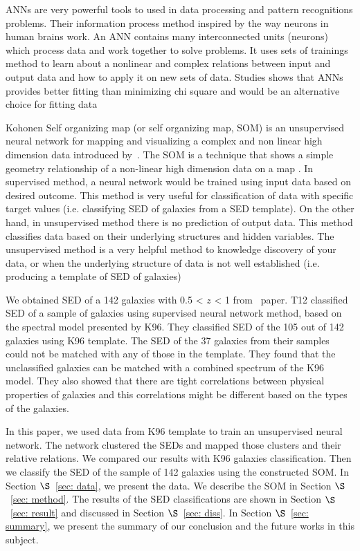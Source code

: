 ANNs are very powerful tools to used in data processing and pattern recognitions problems.
Their information process method inspired by the way neurons in human brains work.
An ANN contains many interconnected units (neurons) which process data and work together to solve problems.
It uses sets of trainings method to learn about a nonlinear and complex relations between input and output data and how to apply it on new sets of data.
Studies shows that ANNs provides better fitting than minimizing chi square and would be an alternative choice for fitting data \citep[e.g.][]{Marquez91,Moayed09}

Kohonen Self organizing map (or self organizing map, SOM) is an unsupervised neural network for mapping and visualizing a complex and non linear high dimension data introduced by~\citep{Kohonen82}.
The SOM is a technique that shows a simple geometry relationship of a non-linear high dimension data on a map \citep{Kohonen98}.
In supervised method, a neural network would be trained using input data based on desired outcome.
This method is very useful for classification of data with specific target values (i.e. classifying SED of galaxies from a SED template).
On the other hand, in unsupervised method there is no prediction of output data.
This method classifies data based on their underlying structures and hidden variables.
The unsupervised method is a very helpful method to knowledge discovery of your data, or when the underlying structure of data is not well established (i.e. producing a template of SED of galaxies) %

We obtained SED of a 142 galaxies with 0.5 < $z$ < 1 from~\citet[][hereafter T12]{Hossein12} paper.
T12 classified SED of a sample of galaxies using supervised neural network method, based on the spectral model presented by K96.
They classified SED of the 105 out of 142 galaxies using K96 template. 
The SED of the 37 galaxies from their samples could not be matched with any of those in the template. 
They found that the unclassified galaxies can be matched with a combined spectrum of the K96 model. 
They also showed that there are tight correlations between physical properties of galaxies and this correlations might be different based on the types of the galaxies.

In this paper, we used data from K96 template to train an unsupervised neural network.
The network clustered the SEDs and mapped those clusters and their relative relations.
We compared our results with K96 galaxies classification.
Then we classify the SED of the sample of 142 galaxies using the constructed SOM.
 In Section $\S$~\ref{sec: data}, we present the data. We describe the SOM in Section $\S$~\ref{sec: method}. The results of the SED classifications are shown in Section $\S$~\ref{sec: result} and discussed in Section $\S$~\ref{sec: diss}. In Section $\S$~\ref{sec: summary}, we present the summary of our conclusion and the future works in this subject.
